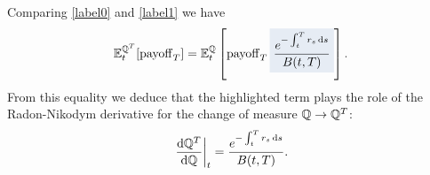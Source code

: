 Comparing \eqref{label0} and \eqref{label1} we have
\begin{equation}
    \mathbb{E}_t^{\Qmeas^T}[\pay_T] = \mathbb{E}_t^{\Qmeas}\left[\pay_T \hlc{mylightblue}{\frac{e^{-\int_t^T r_s\,\dd s}}{B(t,T)}}\right].
\end{equation}
From this equality we deduce that the highlighted term plays the role of the Radon-Nikodym derivative for the change of measure $\mathbb{Q}\to\mathbb{Q}^T$:
\begin{equation}
    \eval{\frac{\dd \Qmeas^T}{\dd \Qmeas}}_t = \frac{e^{-\int_t^T r_s\,\dd s}}{B(t,T)}.
\end{equation}
